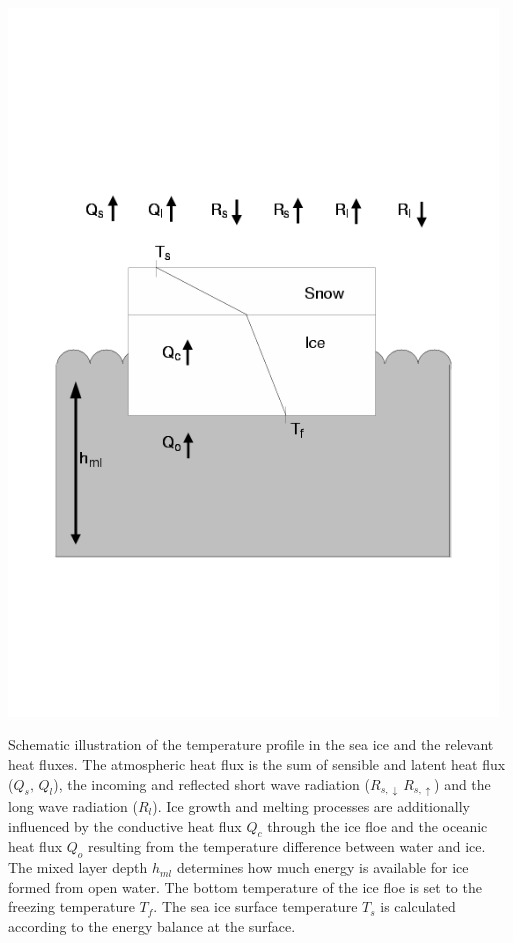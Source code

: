 \bgfht
\def\epsfsize#1#2{0.5#1}
\vspace{-3cm}
\includegraphics[width=13cm]{heiko/modules_icemod_schema}
\vspace{-3cm}
\caption{Schematic illustration of the temperature profile in the sea ice and
the relevant heat fluxes. The atmospheric heat flux is the sum of sensible and
latent heat flux ($Q_s,\,Q_l$), the incoming and reflected short wave 
radiation ($R_{s,\downarrow}\, R_{s,\uparrow}$) and the long wave radiation 
($R_l$). Ice growth and melting processes are additionally influenced by the 
conductive heat flux $Q_c$ through the ice floe and the oceanic heat flux 
$Q_o$ resulting from the temperature difference between water and ice.
The mixed layer depth $h_{ml}$ determines how much energy is available for ice 
formed from open water. The bottom temperature of the ice floe is set to the 
freezing temperature $T_f$. The sea ice surface temperature $T_s$ is 
calculated according to the energy balance at the surface.}
\label{schemafig}
\ef


